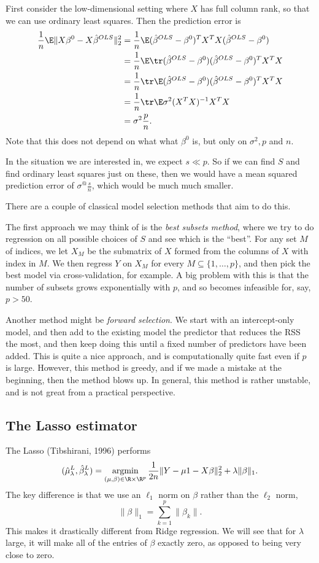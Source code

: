 \documentclass[a4paper]{article}
\DeclareMathOperator*\argmin{argmin}
\begin{document}
First consider the low-dimensional setting where $X$ has full column rank, so that we can use ordinary least squares. Then the prediction error is
\begin{align*}
  \frac{1}{n} \E \|X \beta^0 - X \hat{\beta}^{OLS} \|_2^2 &= \frac{1}{n} \E (\hat{\beta}^{OLS} - \beta^0)^T X^T X (\hat{\beta}^{OLS} - \beta^0)\\
  &= \frac{1}{n} \E \tr (\hat{\beta}^{OLS} - \beta^0) (\hat{\beta}^{OLS} - \beta^0)^T X^T X\\
  &= \frac{1}{n} \tr \E(\hat{\beta}^{OLS} - \beta^0) (\hat{\beta}^{OLS} - \beta^0)^T X^T X\\
  &= \frac{1}{n} \tr \E \sigma^2 (X^T X)^{-1} X^T X\\
  &= \sigma^2 \frac{p}{n}.
\end{align*}
Note that this does not depend on what what $\beta^0$ is, but only on $\sigma^2, p$ and $n$.

In the situation we are interested in, we expect $s \ll p$. So if we can find $S$ and find ordinary least squares just on these, then we would have a mean squared prediction error of $\sigma^@ \frac{s}{n}$, which would be much much smaller.

There are a couple of classical model selection methods that aim to do this.

The first approach we may think of is the \emph{best subsets method}, where we try to do regression on all possible choices of $S$ and see which is the ``best''. For any set $M$ of indices, we let $X_M$ be the submatrix of $X$ formed from the columns of $X$ with index in $M$. We then regress $Y$ on $X_M$ for every $M \subseteq \{1, \ldots, p\}$, and then pick the best model via cross-validation, for example. A big problem with this is that the number of subsets grows exponentially with $p$, and so becomes infeasible for, say, $p > 50$.

Another method might be \emph{forward selection}. We start with an intercept-only model, and then add to the existing model the predictor that reduces the RSS the most, and then keep doing this until a fixed number of predictors have been added. This is quite a nice approach, and is computationally quite fast even if $p$ is large. However, this method is greedy, and if we made a mistake at the beginning, then the method blows up. In general, this method is rather unstable, and is not great from a practical perspective.

\subsection{The Lasso estimator}
The Lasso (Tibshirani, 1996) performs
\[
  (\hat{\mu}_\lambda^L, \hat{\beta}_\lambda^L) = \argmin_{(\mu, \beta) \in \R \times \R^p} \frac{1}{2n} \|Y - \mu 1 - X \beta\|_2^2 + \lambda \|\beta\|_1.
\]
The key difference is that we use an $\ell_1$ norm on $\beta$ rather than the $\ell_2$ norm,
\[
  \|\beta\|_1 = \sum_{k = 1}^p \|\beta_k\|.
\]
This makes it drastically different from Ridge regression. We will see that for $\lambda$ large, it will make all of the entries of $\beta$ exactly zero, as opposed to being very close to zero.
\end{document}
